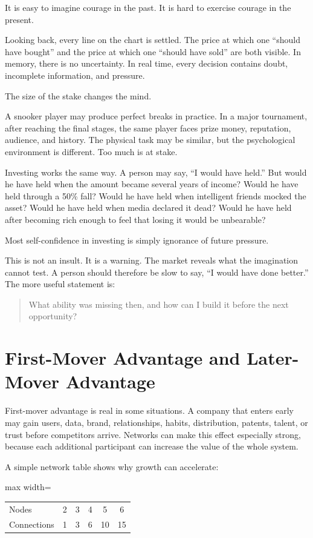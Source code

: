 It is easy to imagine courage in the past. It is hard to exercise courage in the present.

Looking back, every line on the chart is settled. The price at which one ``should have bought'' and the price at which one ``should have sold'' are both visible. In memory, there is no uncertainty. In real time, every decision contains doubt, incomplete information, and pressure.

The size of the stake changes the mind.

A snooker player may produce perfect breaks in practice. In a major tournament, after reaching the final stages, the same player faces prize money, reputation, audience, and history. The physical task may be similar, but the psychological environment is different. Too much is at stake.

Investing works the same way. A person may say, ``I would have held.'' But would he have held when the amount became several years of income? Would he have held through a 50\% fall? Would he have held when intelligent friends mocked the asset? Would he have held when media declared it dead? Would he have held after becoming rich enough to feel that losing it would be unbearable?

Most self-confidence in investing is simply ignorance of future pressure.

This is not an insult. It is a warning. The market reveals what the imagination cannot test. A person should therefore be slow to say, ``I would have done better.'' The more useful statement is:

\begin{quote}
What ability was missing then, and how can I build it before the next opportunity?
\end{quote}

\section*{First-Mover Advantage and Later-Mover Advantage}

First-mover advantage is real in some situations. A company that enters early may gain users, data, brand, relationships, habits, distribution, patents, talent, or trust before competitors arrive. Networks can make this effect especially strong, because each additional participant can increase the value of the whole system.

A simple network table shows why growth can accelerate:

\begin{center}
\begin{adjustbox}{max width=\linewidth}
\begin{tabular}{lccccc}
\hline
Nodes & 2 & 3 & 4 & 5 & 6 \\
Connections & 1 & 3 & 6 & 10 & 15 \\
\hline
\end{tabular}
\end{adjustbox}
\end{center}

